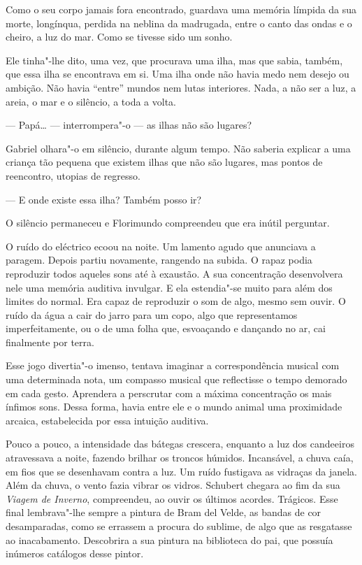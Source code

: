 Como o seu corpo jamais fora encontrado, guardava uma memória límpida da
sua morte, longínqua, perdida na neblina da madrugada, entre o canto das
ondas e o cheiro, a luz do mar. Como se tivesse sido um sonho.

Ele tinha"-lhe dito, uma vez, que procurava uma ilha, mas que sabia,
também, que essa ilha se encontrava em si. Uma ilha onde não havia medo
nem desejo ou ambição. Não havia ``entre'' mundos nem lutas interiores.
Nada, a não ser a luz, a areia, o mar e o silêncio, a toda a volta.

--- Papá\ldots{} --- interrompera"-o --- as ilhas não são lugares?

Gabriel olhara"-o em silêncio, durante algum tempo. Não saberia explicar
a uma criança tão pequena que existem ilhas que não são lugares, mas
pontos de reencontro, utopias de regresso.

--- E onde existe essa ilha? Também posso ir?

O silêncio permaneceu e Florimundo compreendeu que era inútil perguntar.

O ruído do eléctrico ecoou na noite. Um lamento agudo que anunciava a
paragem. Depois partiu novamente, rangendo na subida. O rapaz podia
reproduzir todos aqueles sons até à exaustão. A sua concentração
desenvolvera nele uma memória auditiva invulgar. E ela estendia"-se muito
para além dos limites do normal. Era capaz de reproduzir o som de algo,
mesmo sem ouvir. O ruído da água a cair do jarro para um copo, algo que
representamos imperfeitamente, ou o de uma folha que, esvoaçando e
dançando no ar, cai finalmente por terra.

Esse jogo divertia"-o imenso, tentava imaginar a correspondência musical
com uma determinada nota, um compasso musical que reflectisse o tempo
demorado em cada gesto. Aprendera a perscrutar com a máxima concentração
os mais ínfimos sons. Dessa forma, havia entre ele e o mundo animal uma
proximidade arcaica, estabelecida por essa intuição auditiva.

Pouco a pouco, a intensidade das bátegas crescera, enquanto a luz dos
candeeiros atravessava a noite, fazendo brilhar os troncos húmidos.
Incansável, a chuva caía, em fios que se desenhavam contra a luz. Um
ruído fustigava as vidraças da janela. Além da chuva, o vento fazia
vibrar os vidros. Schubert chegara ao fim da sua \emph{Viagem de
Inverno}, compreendeu, ao ouvir os últimos acordes. Trágicos. Esse final
lembrava"-lhe sempre a pintura de Bram del Velde, as bandas de cor
desamparadas, como se errassem a procura do sublime, de algo que as
resgatasse ao inacabamento. Descobrira a sua pintura na biblioteca do
pai, que possuía inúmeros catálogos desse pintor.

